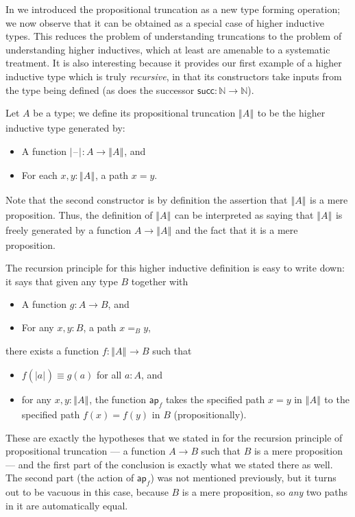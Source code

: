 \documentclass[12pt]{article}
\newcommand{\blank}{\mathord{\hspace{1pt}\text{--}\hspace{1pt}}}
\newcommand{\bproj}[1]{\tproj{}{#1}}
\newcommand{\bprojf}{\tprojf{}}
\newcommand{\brck}[1]{\trunc{}{#1}}
\newcommand{\jdeq}{\equiv}
\newcommand{\mapfunc}[1]{\ensuremath{\mathsf{ap}_{#1}}\xspace}
\newcommand{\N}{\ensuremath{\mathbb{N}}\xspace}
\newcommand{\suc}{\mathsf{succ}}
\newcommand{\tproj}[3][]{\mathopen{}\left|#3\right|_{#2}^{#1}\mathclose{}}
\newcommand{\tprojf}[2][]{|\blank|_{#2}^{#1}}
\newcommand{\trunc}[2]{\mathopen{}\left\Vert #2\right\Vert_{#1}\mathclose{}}
\let\apfunc\mapfunc
\let\nat\N
\begin{document}
%
In  we introduced the propositional truncation as a new type forming operation;
we now observe that it can be obtained as a special case of higher inductive types.
This reduces the problem of understanding truncations to the problem of understanding higher inductives, which at least are amenable to a systematic treatment.
It is also interesting because it provides our first example of a higher inductive type which is truly \emph{recursive}, in that its constructors take inputs from the type being defined (as does the successor $\suc:\nat\to\nat$).

Let $A$ be a type; we define its propositional truncation $\brck A$ to be the higher inductive type generated by:
\begin{itemize}
\item A function $\bprojf : A \to \brck A$, and
\item For each $x,y:\brck A$, a path $x=y$.
\end{itemize}
Note that the second constructor is by definition the assertion that $\brck A$ is a mere proposition.
Thus, the definition of $\brck A$ can be interpreted as saying that $\brck A$ is freely generated by a function $A\to\brck A$ and the fact that it is a mere proposition.

The recursion principle for this higher inductive definition is easy to write down: it says that given any type $B$ together with
\begin{itemize}
\item A function $g:A\to B$, and
\item For any $x,y:B$, a path $x=_B y$,
\end{itemize}
there exists a function $f:\brck A \to B$ such that
\begin{itemize}
\item $f(\bproj a) \jdeq g(a)$ for all $a:A$, and
\item for any $x,y:\brck A$, the function $\apfunc f$ takes the specified path $x=y$ in $\brck A$ to the specified path $f(x) = f(y)$ in $B$ (propositionally).
\end{itemize}
%
These are exactly the hypotheses that we stated in  for the recursion principle of propositional truncation --- a function $A\to B$ such that $B$ is a mere proposition --- and the first part of the conclusion is exactly what we stated there as well.
The second part (the action of $\apfunc f$) was not mentioned previously, but it turns out to be vacuous in this case, because $B$ is a mere proposition, so \emph{any} two paths in it are automatically equal.
\end{document}

